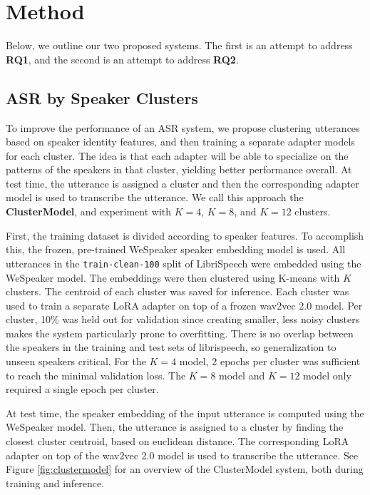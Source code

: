\section{Method}

Below, we outline our two proposed systems.
The first is an attempt to address \textbf{RQ1}, and the second is an attempt to address \textbf{RQ2}.

\subsection{ASR by Speaker Clusters}

To improve the performance of an ASR system, we propose clustering utterances based on speaker identity features, 
and then training a separate adapter models for each cluster.
The idea is that each adapter will be able to specialize on the patterns of the speakers in that cluster, yielding better performance overall.
At test time, the utterance is assigned a cluster and then the corresponding adapter model is used to transcribe the utterance.
We call this approach the \textbf{ClusterModel}, and experiment with $K=4$, $K=8$, and $K=12$ clusters.

First, the training dataset is divided according to speaker features. To accomplish this, the frozen, pre-trained WeSpeaker \cite{wespeaker} speaker embedding model is used.
All utterances in the \verb|train-clean-100| split of LibriSpeech \cite{librispeech} were embedded using the WeSpeaker model.
The embeddings were then clustered using K-means with $K$ clusters. 
The centroid of each cluster was saved for inference.
Each cluster was used to train a separate LoRA adapter on top of a frozen wav2vec 2.0 \cite{wav2vec2} model.
Per cluster, 10\% was held out for validation since creating smaller, less noisy clusters makes the system particularly prone to overfitting.
There is no overlap between the speakers in the training and test sets of librispeech, so generalization to unseen speakers critical.
For the $K=4$ model, 2 epochs per cluster was sufficient to reach the minimal validation loss.
The $K=8$ model and $K=12$ model only required a single epoch per cluster.

At test time, the speaker embedding of the input utterance is computed using the WeSpeaker model.
Then, the utterance is assigned to a cluster by finding the closest cluster centroid, based on euclidean distance.
The corresponding LoRA adapter on top of the wav2vec 2.0 model is used to transcribe the utterance.
See Figure \ref{fig:clustermodel} for an overview of the ClusterModel system, both during training and inference.

